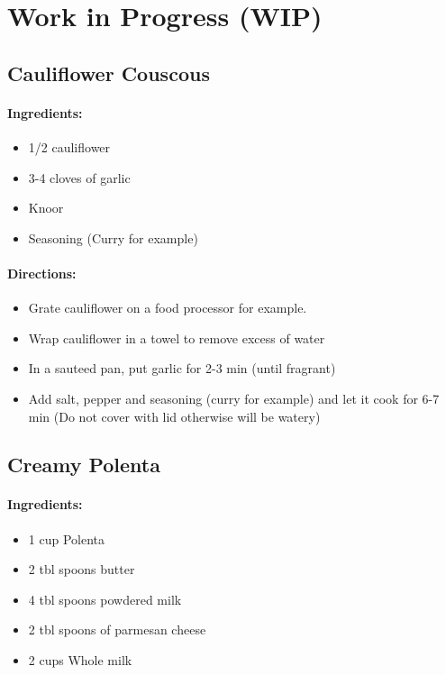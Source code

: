 \documentclass{article}
\begin{document}
\section{Work in Progress (WIP)}

\subsection{Cauliflower Couscous}

\paragraph{Ingredients:}

\begin{itemize}
	\item 1/2 cauliflower
	\item 3-4 cloves of garlic
	\item Knoor
	\item Seasoning (Curry for example)
\end{itemize}

\paragraph{Directions:}
\begin{itemize}
	\item Grate cauliflower on a food processor for example.
	\item Wrap cauliflower in a towel to remove excess of water
	\item In a sauteed pan, put garlic for 2-3 min (until fragrant)
	\item Add salt, pepper and seasoning (curry for example) and let it cook for 6-7 min (Do not cover with lid otherwise will be watery)
\end{itemize}

\subsection{Creamy Polenta}

\paragraph{Ingredients:}

\begin{itemize}
	\item 1 cup Polenta
	\item 2 tbl spoons butter
	\item 4 tbl spoons powdered milk
	\item 2 tbl spoons of parmesan cheese
	\item 2 cups Whole milk
\end{itemize}
\end{document}
